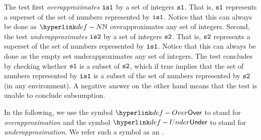The test first \emph{overapproximates} $\texttt{is1}$ by a set of integers $\texttt{s1}$.
That is, $\texttt{s1}$ represents a superset of the set of numbers represented by $\texttt{is1}$.
Notice that this can always be done as $\N$ overapproximates any set of integers.
%
Second, the test \emph{underapproximates} $\texttt{is2}$ by a set of integers $\texttt{s2}$.
That is, $\texttt{s2}$ represents a superset of the set of numbers represented by $\texttt{is1}$.
Notice that this can always be done as the empty set underapproximates any set of integers.
%
The test concludes by checking whether $\texttt{s1}$ is a subset of $\texttt{s2}$,
which if true implies that the set of numbers represented by $\texttt{is1}$ is a subset of the
set of numbers represented by $\texttt{s2}$ (in any environment).
A negative answer on the other hand means that the
test is unable to conclude subsumption.

\hypertarget{def-Under}{}
\hypertarget{def-Over}{}
\hypertarget{def-approximationdirectionterm}{}
In the following, we use the symbol $\Over$ to stand for \emph{overapproximation}
and the symbol $\Under$ to stand for \emph{underapproximation}.
We refer such a symbol as an \approximationdirectionterm.


